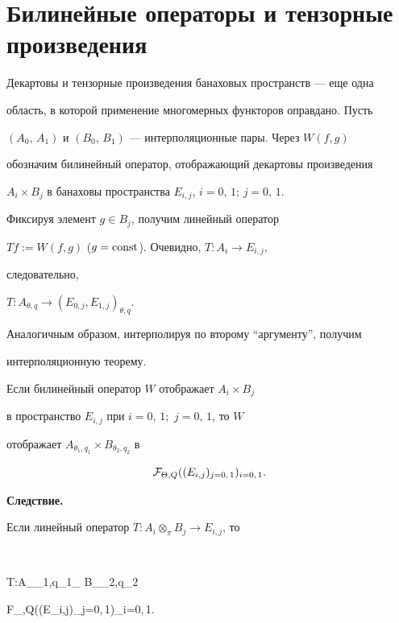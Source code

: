 \section{Билинейные операторы и тензорные произведения}





Декартовы и тензорные произведения банаховых пространств --- еще одна


область, в которой применение многомерных функторов оправдано. Пусть


$(A_0,\,A_1)$ и $(B_0,\,B_1)$ --- интерполяционные пары. Через $W(f,g)$


обозначим билинейный оператор, отображающий декартовы произведения


$A_i\times B_j$ в банаховы пространства $E_{i,j}$, $i=0,\,1$; $j=0,\,1$.


Фиксируя элемент $g\in B_j$, получим линейный оператор


$Tf:=W(f,g)$ ($g=\operatorname{const}$). Очевидно, $T:A_i\rightarrow E_{i,j}$,


следовательно,


$T:A_{\theta, q}\rightarrow (E_{0,j},E_{1,j})_{\theta,q}$.


Аналогичным образом, интерполируя по второму ``аргументу'', получим


интерполяционную теорему.





\begin{thm}


Если билинейный оператор $W$ отображает $A_i\times B_j$


в пространство $E_{i,j}$ при $i=0,\,1;$ $j=0,\,1$, то $W$


отображает $A_{\theta_1,q_1}\times B_{\theta_2,q_2}$ в


$$


{\cal F}_{\Theta,Q}((E_{i,j})_{j=0,\,1})_{i=0,\,1}.


$$


\end{thm}





{\bf Следствие.}


Если линейный оператор $T:A_i\otimes_{\pi}B_j\rightarrow E_{i,j}$, то


$$


T:A_{\theta_1,q_1}\otimes_{\pi} B_{\theta_2,q_2} \rightarrow


{\cal F}_{\Theta,Q}((E_{i,j})_{j=0,\,1})_{i=0,\,1}.


